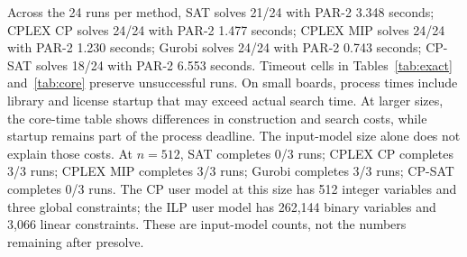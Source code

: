 Across the 24 runs per method, SAT solves 21/24 with PAR-2 3.348 seconds; CPLEX CP solves 24/24 with PAR-2 1.477 seconds; CPLEX MIP solves 24/24 with PAR-2 1.230 seconds; Gurobi solves 24/24 with PAR-2 0.743 seconds; CP-SAT solves 18/24 with PAR-2 6.553 seconds. Timeout cells in Tables~\ref{tab:exact} and~\ref{tab:core} preserve unsuccessful runs. On small boards, process times include library and license startup that may exceed actual search time. At larger sizes, the core-time table shows differences in construction and search costs, while startup remains part of the process deadline. The input-model size alone does not explain those costs.
At $n=512$, SAT completes 0/3 runs; CPLEX CP completes 3/3 runs; CPLEX MIP completes 3/3 runs; Gurobi completes 3/3 runs; CP-SAT completes 0/3 runs. The CP user model at this size has 512 integer variables and three global constraints; the ILP user model has 262,144 binary variables and 3,066 linear constraints. These are input-model counts, not the numbers remaining after presolve.
